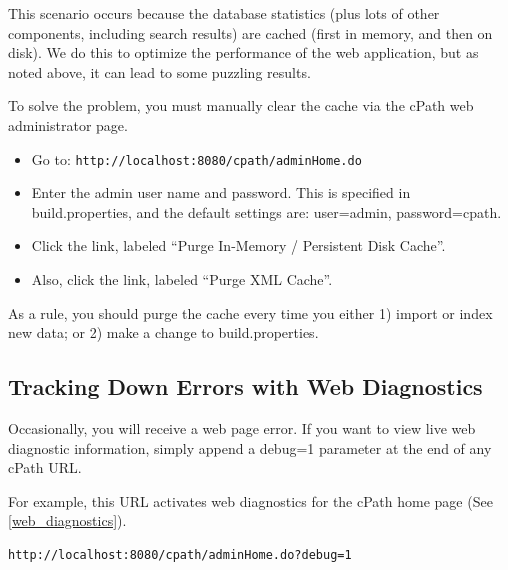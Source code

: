 \documentclass[letterpaper,12pt]{article}
\begin{document}
This scenario occurs because the database statistics (plus lots of other components, including search results) are cached (first in memory, and then on disk).  We do this to optimize the performance of the web application, but as noted above, it can lead to some puzzling results.

To solve the problem, you must manually clear the cache via the cPath web administrator page.

\begin{itemize}

\item Go to:  \verb+http://localhost:8080/cpath/adminHome.do+

\item Enter the admin user name and password.  This is specified in build.properties, and the default settings are:  user=admin, password=cpath.

\item Click the link, labeled ``Purge In-Memory / Persistent Disk Cache''.

\item Also, click the link, labeled ``Purge XML Cache''.

\end{itemize}

As a rule, you should purge the cache every time you either 1) import or index new data;  or 2)  make a change to build.properties.

\subsection{Tracking Down Errors with Web Diagnostics}

Occasionally, you will receive a web page error.  If you want to view live web diagnostic information, simply append a debug=1 parameter at the end of any cPath URL.

For example, this URL activates web diagnostics for the cPath home page (See \ref{web_diagnostics}). 

\begin{verbatim}
http://localhost:8080/cpath/adminHome.do?debug=1
\end{verbatim}
\end{document}
